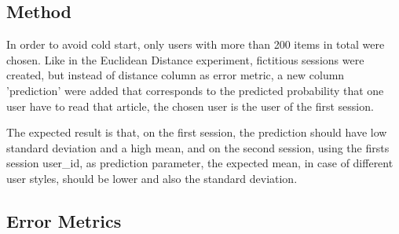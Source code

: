 \documentclass[ecp,tc,english]{iiufrgs}
\begin{document}
        \subsection{Method}
        In order to avoid cold start, only users with more than 200 items in total were chosen.
        Like in the Euclidean Distance experiment, fictitious sessions were created, but instead of distance column as error metric, a new column 'prediction' were added that corresponds to the predicted probability that one user have to read that article, the chosen user is the user of the first session.
        

        The expected result is that, on the first session, the prediction should have low standard deviation and a high mean, and on the second session, using the firsts session user\_id, as prediction parameter, the expected mean, in case of different user styles, should be lower and also the standard deviation.
        
        \newpage 
        
        \subsection{Error Metrics}
\end{document}
